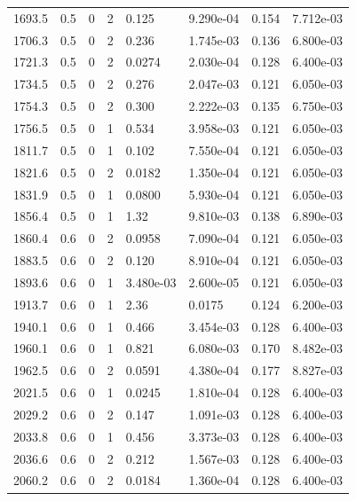 \documentclass[preview]{standalone}
\begin{document}
{{{{\begin{tabular}{L{1.2cm}C{1.2cm} C{0.3cm}C{0.5cm} C{1.4cm}C{1.4cm} C{1.4cm}C{1.4cm}}
  1693.5  &   0.5  & 0     &  2 &  0.125  & 9.290e-04  & 0.154 &  7.712e-03   \\ 
  1706.3  &   0.5  & 0     &  2 &  0.236  & 1.745e-03  & 0.136 &  6.800e-03   \\ 
  1721.3  &   0.5  & 0     &  2 &  0.0274  & 2.030e-04  & 0.128 &  6.400e-03   \\ 
  1734.5  &   0.5  & 0     &  2 &  0.276  & 2.047e-03  & 0.121 &  6.050e-03   \\ 
  1754.3  &   0.5  & 0     &  2 &  0.300  & 2.222e-03  & 0.135 &  6.750e-03   \\ 
  1756.5  &   0.5  & 0     &  1 &  0.534  & 3.958e-03  & 0.121 &  6.050e-03   \\ 
  1811.7  &   0.5  & 0     &  1 &  0.102  & 7.550e-04  & 0.121 &  6.050e-03   \\ 
  1821.6  &   0.5  & 0     &  2 &  0.0182  & 1.350e-04  & 0.121 &  6.050e-03   \\ 
  1831.9  &   0.5  & 0     &  1 &  0.0800  & 5.930e-04  & 0.121 &  6.050e-03   \\ 
  1856.4  &   0.5  & 0     &  1 &  1.32  & 9.810e-03  & 0.138 &  6.890e-03   \\ 
  1860.4  &   0.6  & 0     &  2 &  0.0958  & 7.090e-04  & 0.121 &  6.050e-03   \\ 
  1883.5  &   0.6  & 0     &  2 &  0.120  & 8.910e-04  & 0.121 &  6.050e-03   \\ 
  1893.6  &   0.6  & 0     &  1 &  3.480e-03  & 2.600e-05  & 0.121 &  6.050e-03   \\ 
  1913.7  &   0.6  & 0     &  1 &  2.36  & 0.0175  & 0.124 &  6.200e-03   \\ 
  1940.1  &   0.6  & 0     &  1 &  0.466  & 3.454e-03  & 0.128 &  6.400e-03   \\ 
  1960.1  &   0.6  & 0     &  1 &  0.821  & 6.080e-03  & 0.170 &  8.482e-03   \\ 
  1962.5  &   0.6  & 0     &  2 &  0.0591  & 4.380e-04  & 0.177 &  8.827e-03   \\ 
  2021.5  &   0.6  & 0     &  1 &  0.0245  & 1.810e-04  & 0.128 &  6.400e-03   \\ 
  2029.2  &   0.6  & 0     &  2 &  0.147  & 1.091e-03  & 0.128 &  6.400e-03   \\ 
  2033.8  &   0.6  & 0     &  1 &  0.456  & 3.373e-03  & 0.128 &  6.400e-03   \\ 
  2036.6  &   0.6  & 0     &  2 &  0.212  & 1.567e-03  & 0.128 &  6.400e-03   \\ 
  2060.2  &   0.6  & 0     &  2 &  0.0184  & 1.360e-04  & 0.128 &  6.400e-03   \\ 

\end{tabular}}}}}
\end{document}
